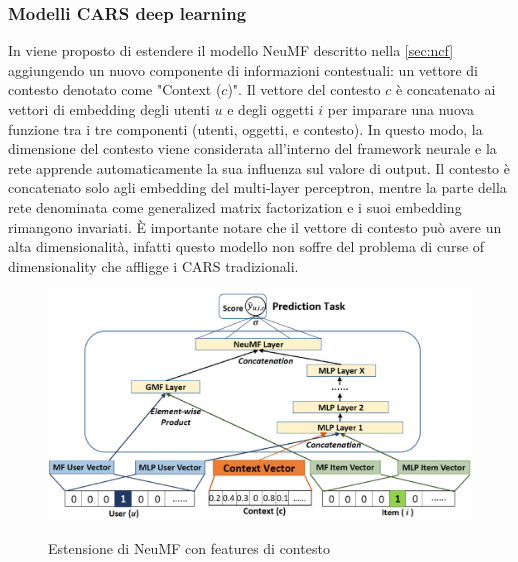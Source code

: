 \subsubsection{Modelli CARS deep learning}
In \cite{context-aware-deep-learning} viene proposto di estendere il modello NeuMF \cite{NCF} descritto nella \autoref{sec:ncf} aggiungendo un nuovo componente di informazioni contestuali: un vettore di contesto denotato come "Context ($c$)". Il vettore del contesto $c$ è concatenato ai vettori di embedding degli utenti $u$ e degli oggetti $i$ per imparare una nuova funzione tra i tre componenti (utenti, oggetti, e contesto). In questo modo, la dimensione del contesto viene considerata all'interno del framework neurale e la rete apprende automaticamente la sua influenza sul valore di output. Il contesto è concatenato solo agli embedding del multi-layer perceptron, mentre la parte della rete denominata come generalized matrix factorization e i suoi embedding rimangono invariati. \`E importante notare che il vettore di contesto può avere un alta dimensionalità, infatti questo modello non soffre del problema di curse of dimensionality che affligge i CARS tradizionali.
\begin{figure}
  \centering
  \includegraphics[width=\linewidth]{immagini/cars-ncf.png}
  \caption{Estensione di NeuMF con features di contesto}
  \label{fig:context-neumf}
  \cite{context-aware-deep-learning}
\end{figure}

